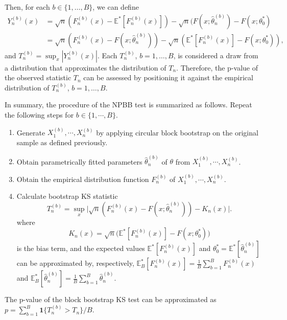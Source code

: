 \documentclass[12pt]{article}
\begin{document}
Then, for each $b \in \{1, \dots, B\}$, we can define
\begin{align*}
  Y^{(b)}_n(x) &= \sqrt{n}(F^{(b)}_n(x) - \mathbb{E}^{*}[F^{(b)}_n(x)]) -
             \sqrt{n}(F(x; \hat\theta^{(b)}_n) - F(x; \theta_0^*) \\
           &= \sqrt{n}(F^{(b)}_n(x) - F(x; \hat\theta^{(b)}_n)) -
             \sqrt{n}(\mathbb{E}^{*}[F^{(b)}_n(x)] - F(x; \theta_0^*)),
\end{align*}
and $T^{(b)}_n = \sup_x|Y^{(b)}_n(x)|$. Each $T_n^{(b)}$,
$b =1, \ldots, B$, is considered a draw from a distribution that approximates
the distribution of $T_n$. Therefore, the p-value of the observed statistic
$T_n$ can be assessed by positioning it against the empirical distribution of
$T_n^{(b)}$, $b = 1, \ldots, B$.


In summary, the procedure of the NPBB test is
summarized as follows. Repeat the following steps for $b \in \{1,  \cdots , B\}$.
\begin{enumerate}
\item
  Generate $X^{(b)}_1, \cdots ,X^{(b)}_n$ by applying circular block bootstrap
  on the original sample as
  defined previously.
\item
  Obtain parametrically fitted parameters
  $\hat\theta^{(b)}_n$ of $\theta$ from $X^{(b)}_1, \cdots ,X^{(b)}_n$.
\item
  Obtain the empirical distribution function $F^{(b)}_n$ of
  $X^{(b)}_1, \cdots ,X^{(b)}_n$.
\item
  Calculate bootstrap KS statistic
  \[
    T^{(b)}_n = \sup_x \Big\vert \sqrt{n}\left(F^{(b)}_n(x)
    - F(x; \hat\theta^{(b)}_n)\right) - K_n(x) \Big\vert.
  \]
  where
  \[
    K_{n}(x) = \sqrt{n}\bigl(\mathbb{E}^{*}[F^{(b)}_n(x)] -
    F(x; \theta_0^*)\bigr)
  \]
  is the bias term, and
  the expected values $\mathbb{E}^{*}[F^{(b)}_n(x)]$ and
$\theta_0^* = \mathbb{E}^{*}[\hat\theta^{(b)}_n]$ can be
approximated by, respectively,
$\mathbb{E}_B^{*}[F^{(b)}_n(x)] = \frac{1}{B}\sum_{b = 1}^B F^{(b)}_n(x)$ and
$\mathbb{E}_B^{*}[\hat\theta^{(b)}_n]  =  \frac{1}{B}\sum_{b = 1}^B\hat\theta^{(b)}_n$.
\end{enumerate}
The p-value of the block bootstrap KS test can be approximated
as $p = \sum_{b=1}^B \mathbf{1}\{T^{(b)}_n > T_n\} / B$.
\end{document}
